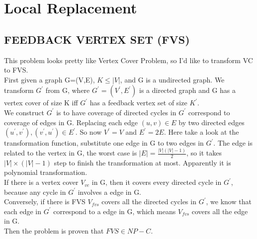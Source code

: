 \documentclass[12pt]{report}
\begin{document}
\section{Local Replacement}

\subsection{FEEDBACK VERTEX SET (FVS)}
This problem looks pretty like Vertex Cover Problem, so I'd like to transform VC to FVS. \\
First given a graph G=(V,E), $K \le |V|$, and G is a undirected graph. We transform $G^{'}$ from G, where $G^{'} = (V^{'}, E^{'})$ is a directed graph and G has a vertex cover of size K iff $G^{'}$ has a feedback vertex set of size $K^{'}$. \\
We construct $G^{'}$ is to have coverage of directed cycles in $G^{'}$ correspond to coverage of edges in G. Replacing each edge $(u,v) \in E$ by two directed edges $(u^{'}, v^{'}), (v^{'}, u^{'}) \in E^{'}$. So now $V^{'} = V$ and $E^{'} = 2E$. Here take a look at the transformation function, substitute one edge in  G to two edges in $G^{'}$. The edge is related to the vertex in G, the worst case is $|E| = \frac {|V|(|V|-1)}{2}$, so it takes $|V| \times (|V|-1)$ step to finish the transformation at most. Apparently it is polynomial transformation. \\
If there is a vertex cover $V_{vc}$ in G, then it covers every directed cycle in $G^{'}$, because any cycle in $G^{'}$ involves a edge in G. \\
Conversely, if there is FVS $V_{fvs}$ covers all the directed cycles in $G^{'}$, we know that each edge in $G^{'}$ correspond to a edge in G, which means $V_{fvs}$ covers all the edge in G. \\
Then the problem is proven that $FVS \in NP-C$.
\end{document}
